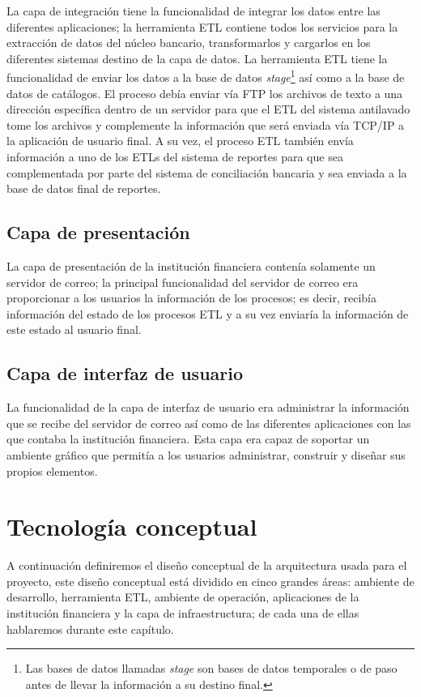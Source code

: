 La capa de integración tiene la funcionalidad de integrar los datos entre las
diferentes aplicaciones; la herramienta ETL contiene todos los servicios para la
extracción de datos del núcleo bancario, transformarlos y cargarlos en los
diferentes sistemas destino de la capa de datos. La herramienta ETL tiene la
funcionalidad de enviar los datos a la base de datos \emph{stage}\footnote{Las
  bases de datos llamadas \emph{stage} son bases de datos temporales o de paso
  antes de llevar la información a su destino final.} así como a la base de
datos de catálogos. El proceso debía enviar vía FTP los archivos de texto a una
dirección específica dentro de un servidor para que el ETL del sistema
antilavado tome los archivos y complemente la información que será enviada vía
TCP/IP a la aplicación de usuario final. A su vez, el proceso ETL también envía
información a uno de los ETLs del sistema de reportes para que sea
complementada por parte del sistema de conciliación bancaria y sea enviada a la
base de datos final de reportes.

\subsection{Capa de presentación}

La capa de presentación de la institución financiera contenía solamente un
servidor de correo; la principal funcionalidad del servidor de correo era
proporcionar a los usuarios la información de los procesos; es decir, recibía
información del estado de los procesos ETL y a su vez enviaría la información
de este estado al usuario final.

\subsection{Capa de interfaz de usuario}

La funcionalidad de la capa de interfaz de usuario era administrar la
información que se recibe del servidor de correo así como de las diferentes
aplicaciones con las que contaba la institución financiera. Esta capa era capaz
de soportar un ambiente gráfico que permitía a los usuarios administrar,
construir y diseñar sus propios elementos.

\section{Tecnología conceptual}

A continuación definiremos el diseño conceptual de la arquitectura usada para el
proyecto, este diseño conceptual está dividido en cinco grandes áreas: ambiente
de desarrollo, herramienta ETL, ambiente de operación, aplicaciones de la
institución financiera y la capa de infraestructura; de cada una de ellas
hablaremos durante este capítulo.

